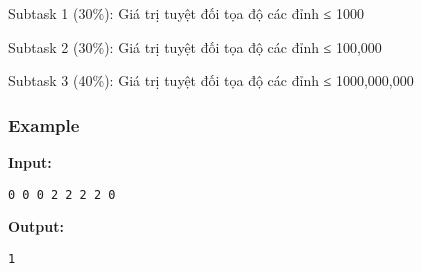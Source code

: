    Subtask 1 (30\%): Giá trị tuyệt đối tọa độ các đỉnh ≤ 1000  

   Subtask 2 (30\%): Giá trị tuyệt đối tọa độ các đỉnh ≤ 100,000  

   Subtask 3 (40\%): Giá trị tuyệt đối tọa độ các đỉnh ≤ 1000,000,000  

\subsubsection{   Example  }

\textbf{    Input:   }
\begin{verbatim}
0 0 0 2 2 2 2 0
\end{verbatim}

\textbf{    Output:   }
\begin{verbatim}
1\end{verbatim}
